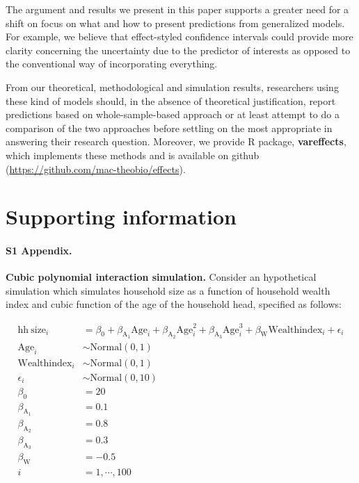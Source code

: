 \documentclass[10pt,letterpaper]{article}
\newcommand{\pkg}[1]{\textbf{#1}}
\let\proglang=\textsf
\begin{document}
The argument and results we present in this paper supports a greater need for a shift on focus on what and how to present predictions from generalized models. For example, we believe that effect-styled confidence intervals could provide more clarity concerning the uncertainty due to the predictor of interests as opposed to the conventional way of incorporating everything. 

From our theoretical, methodological and simulation results, researchers using these kind of models should, in the absence of theoretical justification, report predictions based on whole-sample-based approach or at least attempt to do a comparison of the two approaches before settling on the most appropriate in answering their research question. Moreover, we provide \proglang{R} package, \pkg{vareffects}, which implements these methods and is available on github (\href{https://github.com/mac-theobio/effects}{https://github.com/mac-theobio/effects}).


\section*{Supporting information}

\paragraph*{S1 Appendix.}
\label{S1_Appendix}
{\bf Cubic polynomial interaction simulation.} Consider an hypothetical simulation which simulates household size as a function of household wealth index and cubic function of the age of the household head, specified as follows:

\begin{align}\label{sim:lm_cubic}
\mathrm{hh~size}_i &= \beta_0 + \beta_{\mathrm{A_1}}\mathrm{Age}_i + \beta_{\mathrm{A_2}}\mathrm{Age}^2_i + \beta_{\mathrm{A_3}}\mathrm{Age}^3_i + \beta_{\mathrm{W}}\mathrm{Wealthindex}_i + \epsilon_i \nonumber\\
\mathrm{Age}_i &\sim \mathrm{Normal}(0, 1) \nonumber\\
\mathrm{Wealthindex}_i &\sim \mathrm{Normal}(0, 1) \nonumber\\
\epsilon_i &\sim \mathrm{Normal}(0, 10) \nonumber\\
\beta_0 &= 20 \nonumber\\
\beta_{\mathrm{A}_1} &= 0.1 \nonumber\\
\beta_{\mathrm{A}_2} &= 0.8 \nonumber\\
\beta_{\mathrm{A}_3} &= 0.3 \nonumber\\
\beta_{\mathrm{W}} &= -0.5 \nonumber\\
i &= 1,\cdots, 100
\end{align}
\end{document}
